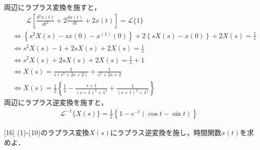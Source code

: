 \documentclass[a4paper,12pt]{article}
\begin{document}
\begin{tcolorbox}[title={[15] つぎの微分方程式をラプラス変換を用いて解け．\\
  \[
  \frac{d^2 x(t)}{dt^2} + 2\frac{dx(t)}{dt} + 2x(t) = 1 \\
  \]
  
  \quad ただし，初期条件は，$x(0)=0 , x^{1}(0)=1$ とする． }]

  \quad 両辺にラプラス変換を施すと，
\begin{align*}
    &\qquad \mathcal{L}\left[ \frac{d^2 x(t)}{dt^2} + 2 \frac{dx(t)}{dt} + 2x(t) \right] = \mathcal{L}\{1\} \\
    &\Leftrightarrow \left\{s^2 X(s) - sx(0) - x^{(1)}(0) \right\} 
    + 2 \left\{ sX(s) - x(0) \right\} + 2X(s) 
    = \frac{1}{s} \\
    &\Leftrightarrow s^2 X(s) - 1 + 2sX(s) + 2X(s) = \frac{1}{s} \\
    &\Leftrightarrow s^2 X(s) + 2sX(s) + 2X(s) = \frac{1}{s} + 1 \\
    &\Leftrightarrow X(s) = \frac{1}{s(s^2 + 2s + 2)} + \frac{1}{s^2 + 2s + 2} \\
    &\Leftrightarrow X(s) = \frac{1}{2} \left\{ \frac{1}{s} - \frac{s+1}{(s+1)^2 + 1^2} + \frac{1}{(s+1)^2 + 1^2} \right\}
\end{align*}
\qquad 両辺にラプラス逆変換を施すと，
    \vspace{-3mm}
\begin{align*}
    \mathcal{L}^{-1}\{X(s)\} = \frac{1}{2} \left\{ 1 - e^{-t}(\cos t - \sin t) \right\}
\end{align*}



\vspace{2mm}
  \end{tcolorbox}

\newpage

[16] (1)-(10)のラプラス変換$X(s)$にラプラス逆変換を施し，時間関数$x(t)$を求めよ．\\
\end{document}
